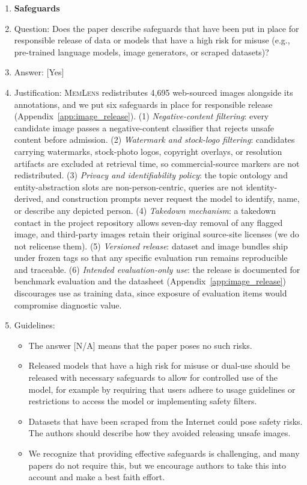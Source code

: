 \documentclass{llmxive}
\providecommand{\bench}{\textsc{MemLens}}
\providecommand{\answerYes}[1][]{[Yes]#1}
\providecommand{\answerNA}[1][]{[N/A]#1}
\begin{document}
\begin{enumerate}
\item {\bf Safeguards}
    \item[] Question: Does the paper describe safeguards that have been put in place for responsible release of data or models that have a high risk for misuse (e.g., pre-trained language models, image generators, or scraped datasets)?
    \item[] Answer: \answerYes{}
    \item[] Justification: \bench{} redistributes 4{,}695 web-sourced images alongside its annotations, and we put six safeguards in place for responsible release (Appendix~\ref{app:image_release}). (1) \emph{Negative-content filtering}: every candidate image passes a negative-content classifier that rejects unsafe content before admission. (2) \emph{Watermark and stock-logo filtering}: candidates carrying watermarks, stock-photo logos, copyright overlays, or resolution artifacts are excluded at retrieval time, so commercial-source markers are not redistributed. (3) \emph{Privacy and identifiability policy}: the topic ontology and entity-abstraction slots are non-person-centric, queries are not identity-derived, and construction prompts never request the model to identify, name, or describe any depicted person. (4) \emph{Takedown mechanism}: a takedown contact in the project repository allows seven-day removal of any flagged image, and third-party images retain their original source-site licenses (we do not relicense them). (5) \emph{Versioned release}: dataset and image bundles ship under frozen tags so that any specific evaluation run remains reproducible and traceable. (6) \emph{Intended evaluation-only use}: the release is documented for benchmark evaluation and the datasheet (Appendix~\ref{app:image_release}) discourages use as training data, since exposure of evaluation items would compromise diagnostic value.
    \item[] Guidelines:
    \begin{itemize}
        \item The answer \answerNA{} means that the paper poses no such risks.
        \item Released models that have a high risk for misuse or dual-use should be released with necessary safeguards to allow for controlled use of the model, for example by requiring that users adhere to usage guidelines or restrictions to access the model or implementing safety filters.
        \item Datasets that have been scraped from the Internet could pose safety risks. The authors should describe how they avoided releasing unsafe images.
        \item We recognize that providing effective safeguards is challenging, and many papers do not require this, but we encourage authors to take this into account and make a best faith effort.
    \end{itemize}


\end{enumerate}
\end{document}
